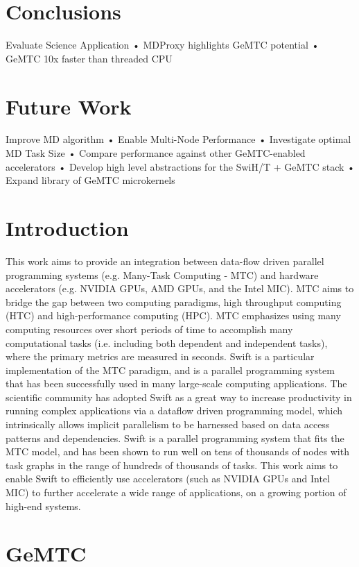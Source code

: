 \documentclass[conference]{IEEEtran}
\begin{document}
\section{Conclusions}
Evaluate Science Application • MDProxy highlights GeMTC potential • GeMTC 10x faster than threaded CPU

\section{Future Work}
Improve MD algorithm • Enable Multi-Node Performance • Investigate optimal MD Task Size • Compare performance against other GeMTC-enabled accelerators • Develop high level abstractions for the SwiH/T + GeMTC stack • Expand library of GeMTC microkernels


\section{Introduction}
This work aims to provide an integration between data-flow driven parallel programming systems (e.g. Many-Task Computing - MTC) and hardware accelerators \cite{kriederGCASR12} (e.g. NVIDIA GPUs, AMD GPUs, and the Intel MIC). MTC aims to bridge the gap between two computing paradigms, high throughput computing (HTC) and high-performance computing (HPC). MTC emphasizes using many computing resources over short periods of time to accomplish many computational tasks (i.e. including both dependent and independent tasks), where the primary metrics are measured in seconds.\cite{raicu2008toward} Swift is a particular implementation of the MTC paradigm, and is a parallel programming system that has been successfully used in many large-scale computing applications. \cite{zhao2007swift} The scientific community has adopted Swift as a great way to increase productivity in running complex applications via a dataflow driven programming model, which intrinsically allows implicit parallelism to be harnessed based on data access patterns and dependencies. Swift is a parallel programming system that fits the MTC model, and has been shown to run well on tens of thousands of nodes with task graphs in the range of hundreds of thousands of tasks. This work aims to enable Swift to efficiently use accelerators (such as NVIDIA GPUs and Intel MIC) to further accelerate a wide range of applications, on a growing portion of high-end systems.

\section{GeMTC}
\end{document}
